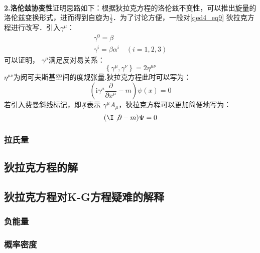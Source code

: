 \\\textbf{2.洛伦兹协变性}证明思路如下：根据狄拉克方程的洛伦兹不变性，可以推出旋量的洛伦兹变换形式，进而得到自旋为$\frac{1}{2}$．为了讨论方便，一般对\autoref{qed4_eq9} 狄拉克方程进行改写．引入$\gamma^{\mu}$：
\begin{equation}
\begin{array}{l}
\gamma^{0}=\beta \\
\gamma^{i}=\beta \alpha^{i} \quad(i=1,2,3)
\end{array}
\end{equation}
可以证明， $\gamma^{\mu}$满足反对易关系：
\begin{equation}
\left\{\gamma^{\mu}, \gamma^{\nu}\right\}=2 \eta^{\mu \nu}
\end{equation}
$\eta^{\mu \nu}$为闵可夫斯基空间的度规张量.狄拉克方程此时可以写为：
\begin{equation}
\left(\mathrm{i} \gamma^{\mu} \frac{\partial}{\partial x^{\mu}}-m\right) \psi(x)=0
\end{equation}
若引入费曼斜线标记，即$\not A$表示 $\gamma^{\mu}A_{\mu}$，狄拉克方程可以更加简便地写为：
\begin{equation}
( \I \not \partial-m) \Psi=0
\end{equation}
\subsubsection{拉氏量}

\subsection{狄拉克方程的解}
\subsection{狄拉克方程对K-G方程疑难的解释}
\subsubsection{负能量}
\subsubsection{概率密度}




